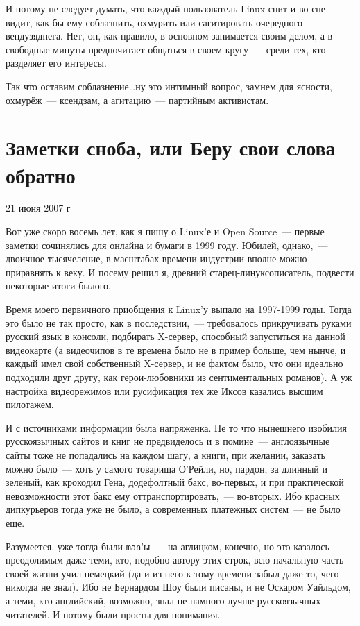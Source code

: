 И потому не следует думать, что каждый пользователь Linux спит и во сне видит, как бы ему соблазнить, охмурить или сагитировать очередного вендузяднега. Нет, он, как правило, в основном занимается своим делом, а в свободные минуты предпочитает общаться в своем кругу~--- среди тех, кто разделяет его интересы. 

Так что оставим соблазнение\dots ну это интимный вопрос, замнем для ясности, охмурёж~--- ксендзам, а агитацию~--- партийным активистам. 

\section{Заметки сноба, или Беру свои слова обратно} 

\begin{timeline}21 июня 2007 г\end{timeline}

Вот уже скоро восемь лет, как я пишу о Linux'е и Open Source~--- первые заметки сочинялись для онлайна и бумаги в 1999 году. Юбилей, однако,~--- двоичное тысячеление, в масштабах времени индустрии вполне можно приравнять к веку. И посему решил я, древний старец-линуксописатель, подвести некоторые итоги былого.

Время моего первичного приобщения к Linux'у выпало на 1997-1999 годы. Тогда это было не так просто, как в последствии,~--- требовалось прикручивать руками русский язык в консоли, подбирать X-сервер, способный запуститься на данной видеокарте (а видеочипов в те времена было не в пример больше, чем нынче, и каждый имел свой собственный X-сервер, и не фактом было, что они идеально подходили друг другу, как герои-любовники из сентиментальных романов). А уж настройка видеорежимов или русификация тех же Иксов казались высшим пилотажем.

И с источниками информации была напряженка. Не то что нынешнего изобилия русскоязычных сайтов и книг не предвиделось и в помине~--- англоязычные сайты тоже не попадались на каждом шагу, а книги, при желании, заказать можно было~--- хоть у самого товарища О'Рейли, но, пардон, за длинный и зеленый, как крокодил Гена, додефолтный бакс, во-первых, и при практической невозможности этот бакс ему оттранспортировать,~--- во-вторых. Ибо красных дипкурьеров тогда уже не было, а современных платежных систем~--- не было еще.

Разумеется, уже тогда были \mbox{\texttt{man}'ы}~--- на аглицком, конечно, но это казалось преодолимым даже теми, кто, подобно автору этих строк, всю начальную часть своей жизни учил немецкий (да и из него к тому времени забыл даже то, чего никогда не знал). Ибо не Бернардом Шоу были писаны, и не Оскаром Уайльдом, а теми, кто английский, возможно, знал не намного лучше русскоязычных читателей. И потому были просты для понимания.

